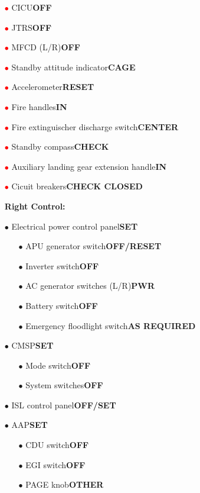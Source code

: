 \documentclass[a4paper,12pt,dvipsnames]{letter}
\newcommand{\button}[1]{\textbf{#1}}
\newcommand{\bi}{\textcolor{ProcessBlue}{$\bullet$\;}}
\newcommand{\ri}{\textcolor{Red}{$\bullet$\;}}
\newcommand{\tb}[1]{\textbf{#1}}
\begin{document}
{\begin{itemize}
 \item[\ri] CICU\dotfill\button{OFF}
 \item[\ri] JTRS\dotfill\button{OFF}
 \item[\ri] MFCD (L/R)\dotfill\button{OFF}
 \item[\ri] Standby attitude indicator\dotfill\button{CAGE}
 \item[\ri] Accelerometer\dotfill\button{RESET}
 \item[\ri] Fire handles\dotfill\button{IN}
 \item[\ri] Fire extinguischer discharge switch\dotfill\button{CENTER}
 \item[\ri] Standby compass\dotfill\button{CHECK}
 \item[\ri] Auxiliary landing gear extension handle\dotfill\button{IN}
 \item[\ri] Cicuit breakers\dotfill\button{CHECK CLOSED}
\end{itemize}
\begin{itemize}
 \item[]\tb{Right Control:}
 \item[\bi] Electrical power control panel\dotfill\button{SET}
 \begin{itemize}
  \item[\bi] APU generator switch\dotfill\button{OFF/RESET}
  \item[\bi] Inverter switch\dotfill\button{OFF}
  \item[\bi] AC generator switches (L/R)\dotfill\button{PWR}
  \item[\bi] Battery switch\dotfill\button{OFF}
  \item[\bi] Emergency floodlight switch\dotfill\button{AS REQUIRED}
 \end{itemize}
 \item[\bi] CMSP\dotfill\button{SET}
 \begin{itemize}
  \item[\bi] Mode switch\dotfill\button{OFF}
  \item[\bi] System switches\dotfill\button{OFF}
 \end{itemize}
 \item[\bi] ISL control panel\dotfill\button{OFF/SET}
 \item[\bi] AAP\dotfill\button{SET}
 \begin{itemize}
  \item[\bi] CDU switch\dotfill\button{OFF}
  \item[\bi] EGI switch\dotfill\button{OFF}
  \item[\bi] PAGE knob\dotfill\button{OTHER}

\end{itemize}
\end{itemize}}
\end{document}
